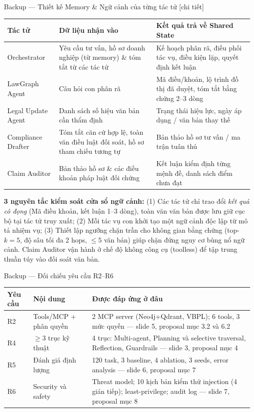 \documentclass[aspectratio=169,10pt]{beamer}
\begin{document}
\begin{frame}{Backup --- Thiết kế Memory \& Ngữ cảnh của từng tác tử [chi tiết]}
\scriptsize
\begin{tabular}{@{}p{2.5cm}p{4.6cm}p{4.4cm}@{}}
\toprule
Tác tử & Dữ liệu nhận vào & Kết quả trả về Shared State\\ \midrule
Orchestrator & Yêu cầu tư vấn, hồ sơ doanh nghiệp (từ memory) \& tóm tắt từ các tác tử & Kế hoạch phân rã, điều phối tác vụ, điều kiện lặp, quyết định kết luận\\
LawGraph Agent & Câu hỏi con phân rã & Mã điều/khoản, lộ trình đồ thị đã duyệt, tóm tắt bằng chứng 2--3 dòng\\
Legal Update Agent & Danh sách số hiệu văn bản cần thẩm định & Trạng thái hiệu lực, ngày áp dụng / văn bản thay thế\\
Compliance Drafter & Tóm tắt căn cứ hợp lệ, toàn văn điều luật đối soát, hồ sơ tham chiếu tương tự & Bản thảo hồ sơ tư vấn / ma trận tuân thủ\\
Claim Auditor & Bản thảo hồ sơ \& các điều khoản pháp luật đối chứng & Kết luận kiểm định từng mệnh đề, danh sách điểm chưa đạt\\
\bottomrule
\end{tabular}
\vskip0.15cm
{\tiny \textbf{3 nguyên tắc kiểm soát cửa sổ ngữ cảnh:} (1) Các tác tử chỉ trao đổi \emph{kết quả cô đọng} (Mã điều khoản, kết luận 1--3 dòng), toàn văn văn bản được lưu giữ cục bộ tại tác tử truy xuất; (2) Mỗi tác vụ con khởi tạo một ngữ cảnh độc lập từ mô tả nhiệm vụ; (3) Thiết lập ngưỡng chặn trần cho không gian bằng chứng (top-$k=5$, độ sâu tối đa 2 hops, $\le 5$ văn bản) giúp chặn đứng nguy cơ bùng nổ ngữ cảnh. Claim Auditor vận hành ở chế độ không công cụ (toolless) để tập trung thuần túy vào đối soát văn bản.}
\end{frame}

\begin{frame}{Backup --- Đối chiếu yêu cầu R2--R6}
\footnotesize
\begin{tabular}{@{}p{1.0cm}p{4.4cm}p{7.2cm}@{}}
\toprule
Yêu cầu & Nội dung & Được đáp ứng ở đâu\\ \midrule
R2 & Tools/MCP + phân quyền & 2 MCP server (Neo4j+Qdrant, VBPL); 6 tools, 3 mức quyền --- slide 5, proposal mục 3.2 và 6.2\\
R4 & $\ge 3$ trục kỹ thuật & 4 trục: Multi-agent, Planning và selective traversal, Reflection, Guardrails --- slide 3, proposal mục 4\\
R5 & Đánh giá định lượng & 120 task, 3 baseline, 4 ablation, 3 seeds, error analysis --- slide 6, proposal mục 7\\
R6 & Security và safety & Threat model; 10 kịch bản kiểm thử injection (4 gián tiếp); least-privilege; audit log --- slide 7, proposal mục 8\\
\bottomrule
\end{tabular}
\end{frame}
\end{document}

